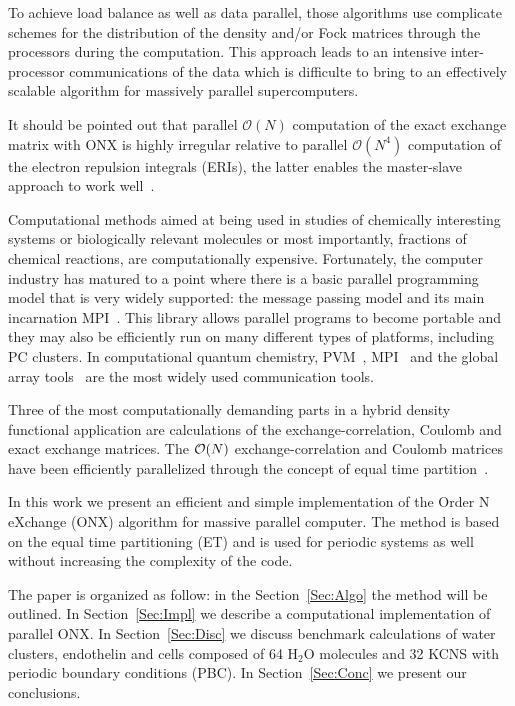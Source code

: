 \documentclass[prl,twocolumn,showpacs,twocolumngrid,superbib]{revtex4}
\begin{document}
 To achieve load balance as well as data parallel, 
 those algorithms use complicate schemes for the 
 distribution of the density and/or Fock 
 matrices through the processors during the computation.
 This approach leads to an intensive inter-processor 
 communications of the data which is difficulte to bring to an 
 effectively scalable algorithm for massively parallel supercomputers. 



 It should be pointed out that parallel $\mathcal{O}(N)$ computation
 of the exact exchange matrix with ONX is highly irregular relative 
 to parallel $\mathcal{O}(N^4)$ computation of the electron repulsion integrals (ERIs), 
 the latter enables the master-slave approach to work well~\cite{RHarrison96}.



 Computational methods aimed at being used in studies of 
 chemically interesting systems or biologically relevant molecules
 or most importantly, fractions of chemical reactions, are
 computationally expensive. Fortunately, the computer 
 industry has matured to a point where there is a basic parallel
 programming model that is very widely supported: the message 
 passing model and its main incarnation MPI~\cite{MPI}. This library
 allows parallel programs to become portable and they may
 also be efficiently run on many different types of platforms, 
 including PC clusters.
 In computational quantum chemistry, PVM~\cite{PVM}, MPI~\cite{MPI} and the 
 global array tools~\cite{JNieplocha94,JNieplocha96} are 
 the most widely used communication tools.
 


 Three of the most computationally demanding parts in a 
 hybrid density functional application are calculations
 of the exchange-correlation, Coulomb and exact exchange 
 matrices. The ${\cal O}(N)$ exchange-correlation and Coulomb matrices
 have been efficiently parallelized through the concept of equal time
 partition~\cite{CGan03,CGan04B}.


 In this work we present an efficient and simple implementation 
 of the Order N eXchange (ONX) algorithm for massive parallel computer. The method
 is based on the equal time partitioning (ET) and is used for periodic systems 
 as well without increasing the complexity of the code.


 The paper is organized as follow: in the Section~\ref{Sec:Algo} the method
 will be outlined.
 In Section~\ref{Sec:Impl} we describe a computational implementation 
 of parallel ONX. In Section~\ref{Sec:Disc} we discuss benchmark calculations of 
 water clusters, endothelin and cells composed of 64 
 H$_2$O molecules and 32 KCNS with periodic boundary conditions (PBC).    
 In Section~\ref{Sec:Conc} we present our conclusions.
\end{document}

